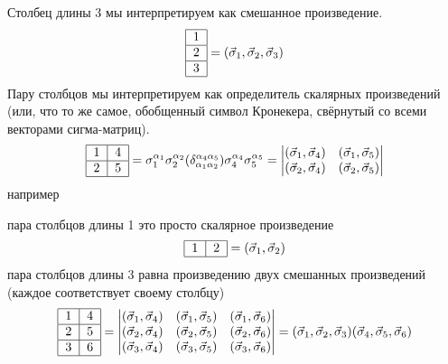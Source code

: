 \documentclass[]{article}
\begin{document}
Столбец длины 3 мы интерпретируем как смешанное произведение.
$$ \begin{tabular}{ | l | }
\hline
1 \\ \hline
2 \\ \hline
3 \\
\hline
\end{tabular} = (\vec \sigma_1, \vec \sigma_2, \vec \sigma_3) $$
Пару столбцов мы интерпретируем как определитель скалярных произведений (или, что то же самое, обобщенный символ Кронекера, свёрнутый со всеми векторами сигма-матриц).
$$ \begin{tabular}{ |l|l| }
\hline
1 & 4 \\ \hline
2 & 5\\ 
\hline
\end{tabular}
 =
 \sigma_1^{\alpha_1} \sigma_2^{\alpha_2} 
 (\delta_{\alpha_1\alpha_2}^{\alpha_4\alpha_5})
 \sigma_4^{\alpha_4} \sigma_5^{\alpha_5} 
 =
\begin{vmatrix}
(\vec\sigma_1,\vec\sigma_4) & (\vec\sigma_1,\vec\sigma_5)\\
(\vec\sigma_2,\vec\sigma_4) & (\vec\sigma_2,\vec\sigma_5)\\
\end{vmatrix}
$$
например

пара столбцов длины 1 это просто скалярное произведение
$$\begin{tabular}{ |l|l| }
\hline
1 & 2 \\
\hline
\end{tabular}
= (\vec \sigma_1, \vec \sigma_2)
$$
пара столбцов длины 3 равна произведению двух смешанных произведений (каждое соответствует  своему столбцу)
$$ \begin{tabular}{ |l|l| }
\hline
1 & 4 \\ \hline
2 & 5\\ \hline
3 & 6\\
\hline
\end{tabular}
= 
\begin{vmatrix}
(\vec\sigma_1,\vec\sigma_4) & (\vec\sigma_1,\vec\sigma_5) & (\vec\sigma_1,\vec\sigma_6) \\
(\vec\sigma_2,\vec\sigma_4) & (\vec\sigma_2,\vec\sigma_5) & (\vec\sigma_2,\vec\sigma_6) \\
(\vec\sigma_3,\vec\sigma_4) & (\vec\sigma_3,\vec\sigma_5) & (\vec\sigma_3,\vec\sigma_6) \\
\end{vmatrix}
=
(\vec \sigma_1, \vec \sigma_2, \vec \sigma_3)
(\vec \sigma_4, \vec \sigma_5, \vec \sigma_6)
$$
\end{document}
